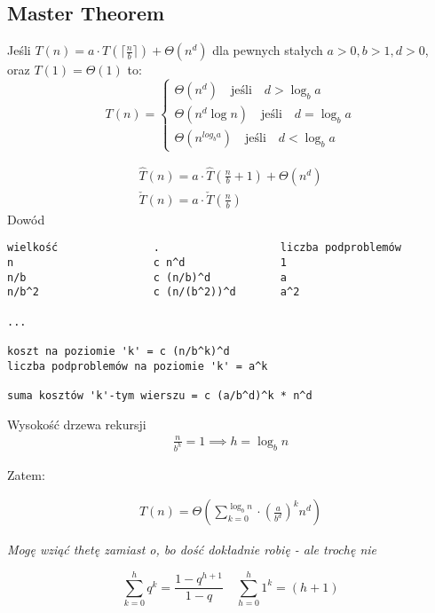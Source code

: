 \documentclass{article}
\newenvironment{theorem}[1]{%
    \trivlist
    \item[\hskip\labelsep\textbf{Theorem. #1.}]
    \ignorespaces
}{%
    \endtrivlist
}
\begin{document}
\subsection{Master Theorem}

\begin{theorem}{Master Theorem}
    Jeśli $T(n) = a\cdot T(\lceil \frac{n}{b} \rceil) + \Theta(n^d)$ dla pewnych stałych $a>0, b>1, d>0$, oraz $T(1)=\Theta(1)$ to:
    \[
    T(n) = \begin{cases}
        \Theta\left(n^d\right) \quad \text{jeśli} \quad d > \log_b a\\
        \Theta\left(n^d \log n\right) \quad \text{jeśli} \quad d = \log_b a\\
        \Theta\left(n^{log_b a}\right) \quad \text{jeśli} \quad d < \log_b a
    \end{cases}
    \]
\end{theorem}

\begin{align}
\hat{T} (n) = a\cdot \hat{T} \left(\frac{n}{b} + 1 \right) + \Theta(n^d)\\
\check{T} (n) = a\cdot \check{T} \left(\frac{n}{b} \right)
\end{align}
Dowód
\begin{verbatim}
wielkość               .                   liczba podproblemów    
n                      c n^d               1                       
n/b                    c (n/b)^d           a
n/b^2                  c (n/(b^2))^d       a^2

...

koszt na poziomie 'k' = c (n/b^k)^d
liczba podproblemów na poziomie 'k' = a^k

suma kosztów 'k'-tym wierszu = c (a/b^d)^k * n^d
\end{verbatim}

Wysokość drzewa rekursji
\begin{align}
    \frac{n}{b^h} = 1 \implies h = \log_b n
\end{align}

Zatem:

\begin{align}
    T(n) = \Theta\left(\sum_{k=0}^{\log_b n} \cdot \left(\frac{a}{b^d}\right)^k n^d \right)
\end{align}

\textit{Mogę wziąć thetę zamiast o, bo dość dokładnie robię - ale trochę nie}

\[
    \sum_{k=0}^{h} q^k = \frac{1-q^{h+1}}{1-q} \quad \sum_{h=0}^{h} 1^k = (h+1)
\]
\end{document}
